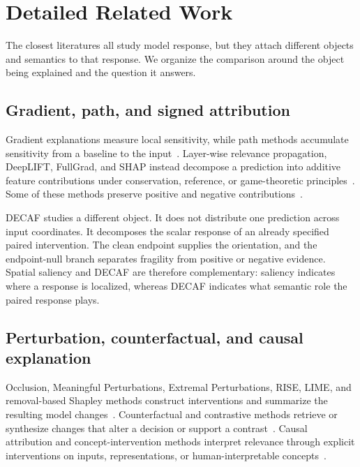 \section{Detailed Related Work}
\label{app:related}

The closest literatures all study model response, but they attach different objects and semantics to that response. We organize the comparison around the object being explained and the question it answers.

\subsection{Gradient, path, and signed attribution}

Gradient explanations measure local sensitivity, while path methods accumulate sensitivity from a baseline to the input~\citep{simonyan2014deep,selvaraju2017gradcam,sundararajan2017axiomatic,smilkov2017smoothgrad,xu2020attribution,kapishnikov2021guided,you2026joint}. Layer-wise relevance propagation, DeepLIFT, FullGrad, and SHAP instead decompose a prediction into additive feature contributions under conservation, reference, or game-theoretic principles~\citep{bach2015lrp,shrikumar2017deeplift,srinivas2019fullgrad,lundberg2017unified}. Some of these methods preserve positive and negative contributions~\citep{dhurandhar2018pertinent}.

DECAF studies a different object. It does not distribute one prediction across input coordinates. It decomposes the scalar response of an already specified paired intervention. The clean endpoint supplies the orientation, and the endpoint-null branch separates fragility from positive or negative evidence. Spatial saliency and DECAF are therefore complementary: saliency indicates where a response is localized, whereas DECAF indicates what semantic role the paired response plays.

\subsection{Perturbation, counterfactual, and causal explanation}

Occlusion, Meaningful Perturbations, Extremal Perturbations, RISE, LIME, and removal-based Shapley methods construct interventions and summarize the resulting model changes~\citep{zeiler2014visualizing,fong2017meaningful,fong2019extremal,petsiuk2018rise,ribeiro2016why,covert2021removing}. Counterfactual and contrastive methods retrieve or synthesize changes that alter a decision or support a contrast~\citep{goyal2019counterfactual,chang2019counterfactual,dhurandhar2018pertinent,pmlr-v258-you25a,gu2026discover}. Causal attribution and concept-intervention methods interpret relevance through explicit interventions on inputs, representations, or human-interpretable concepts~\citep{chattopadhyay2019causal,janzing2020causal,goyal2020cace,kim2018tcav,koh2020conceptbottleneck}.

